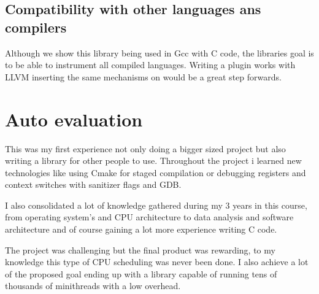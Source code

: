 \documentclass[12pt,a4paper]{report}
\begin{document}
\subsection{Compatibility with other languages ans compilers}
Although we show this library being used in Gcc with C code, the libraries goal is to be able to instrument all compiled languages. Writing a plugin works with LLVM inserting the same mechanisms on would be a great step forwards.

\section{Auto evaluation}
This was my first experience not only doing a bigger sized project but also writing a library for other people to use. Throughout the project i learned new technologies like using Cmake for staged compilation or debugging registers and context switches with sanitizer flags and GDB. 

I also consolidated a lot of knowledge gathered during my 3 years in this course, from operating system's and CPU architecture to data analysis and software architecture and of course gaining a lot more experience writing C code.  

The project was challenging but the final product was rewarding, to my knowledge this type of CPU scheduling was never been done. I also achieve a lot of the proposed goal ending up with a library capable of running tens of thousands of minithreads with a low overhead.
\clearpage
\appendix
\clearpage

\end{document}
